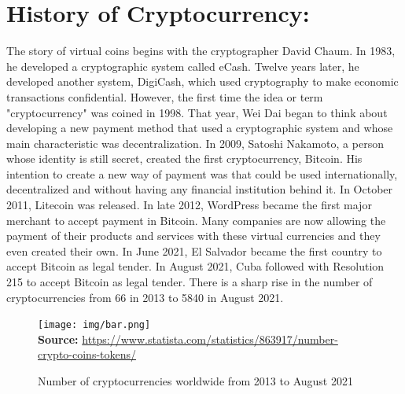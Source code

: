 \documentclass[11pt]{article}
\begin{document}
\section*{History of Cryptocurrency:}
The story of virtual coins begins with the cryptographer David Chaum. In 1983, he developed a cryptographic system called eCash. Twelve years later, he developed another system, DigiCash, which used cryptography to make economic transactions confidential. However, the first time the idea or term "cryptocurrency" was coined in 1998. That year, Wei Dai began to think about developing a new payment method that used a cryptographic system and whose main characteristic was decentralization. In 2009, Satoshi Nakamoto, a person whose identity is still secret, created the first cryptocurrency, Bitcoin. His intention to create a new way of payment was that could be used internationally, decentralized and without having any financial institution behind it. In October 2011, Litecoin was released. In late 2012, WordPress became the first major merchant to accept payment in Bitcoin. Many companies are now allowing the payment of their products and services with these virtual currencies and they even created their own. In June 2021, El Salvador became the first country to accept Bitcoin as legal tender. In August 2021, Cuba followed with Resolution 215 to accept Bitcoin as legal tender. There is a sharp rise in the number of cryptocurrencies from 66 in 2013 to 5840 in August 2021.


\begin{figure}[h]
    \centering
    \caption{Number of cryptocurrencies worldwide from 2013 to August 2021}
    \texttt{[image: img/bar.png]} \\[0.5cm] %
    \textbf{Source:} \url{ https://www.statista.com/statistics/863917/number-crypto-coins-tokens/}
\end{figure}
\end{document}
